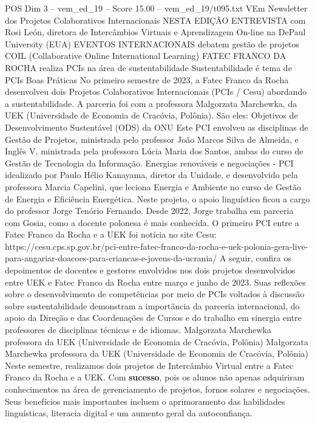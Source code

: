 \begin{textsample}{POS Dim 3 – vem\_ed\_19 – Score 15.00 – vem\_ed\_19/t095.txt}  \label{ex:f3_pos_150}
VEm Newsletter dos Projetos Colaborativos Internacionais NESTA EDIÇÃO ENTREVISTA com Rosi León, diretora de Intercâmbios Virtuais e Aprendizagem On-line na DePaul University (EUA) EVENTOS INTERNACIONAIS debatem gestão de projetos COIL (Collaborative Online International Learning) FATEC FRANCO DA ROCHA realiza PCIs na área de sustentabilidade Sustentabilidade é tema de PCIs Boas Práticas No primeiro semestre de 2023, a Fatec Franco da Rocha desenvolveu dois Projetos Colaborativos Internacionais (PCIs / Cesu) abordando a sustentabilidade.
A parceria foi com a professora Malgorzata Marchewka, da UEK (Universidade de Economia de Cracóvia, Polônia).
São eles: Objetivos de Desenvolvimento Sustentável (ODS) da ONU Este PCI envolveu as disciplinas de Gestão de Projetos, ministrada pelo professor João Marcos Silva de Almeida, e Inglês V, ministrada pela professora Lúcia Maria dos Santos, ambas do curso de Gestão de Tecnologia da Informação.
Energias renováveis e negociações - PCI idealizado por Paulo Hélio Kanayama, diretor da Unidade, e desenvolvido pela professora Marcia Capelini, que leciona Energia e Ambiente no curso de Gestão de Energia e Eficiência Energética.
Neste projeto, o apoio linguístico ficou a cargo do professor Jorge Tenório Fernando.
Desde 2022, Jorge trabalha em parceria com Gosia, como a docente polonesa é mais conhecida.
O primeiro PCI entre a Fatec Franco da Rocha e a UEK foi notícia no site Cesu: https://cesu.cps.sp.gov.br/pci-entre-fatec-franco-da-rocha-e-uek-polonia-gera-live-para-angariar-doacoes-para-criancas-e-jovens-da-ucrania/ A seguir, confira os depoimentos de docentes e gestores envolvidos nos dois projetos desenvolvidos entre UEK e Fatec Franco da Rocha entre março e junho de 2023.
Suas reflexões sobre o desenvolvimento de competências por meio de PCIs voltados à discussão sobre sustentabilidade demonstram a importância da parceria internacional, do apoio da Direção e das Coordenações de Cursos e do trabalho em sinergia entre professores de disciplinas técnicas e de idiomas.
Małgorzata Marchewka professora da UEK (Universidade de Economia de Cracóvia, Polônia) Małgorzata Marchewka professora da UEK (Universidade de Economia de Cracóvia, Polônia) Neste semestre, realizamos dois projetos de Intercâmbio Virtual entre a Fatec Franco da Rocha e a UEK.
Com \textbf{sucesso}, pois os alunos não apenas adquiriram conhecimentos na área de gerenciamento de projetos, fornos solares e negociações.
Seus benefícios mais importantes incluem o aprimoramento das habilidades linguísticas, literacia digital e um aumento geral da autoconfiança.

\end{textsample}
